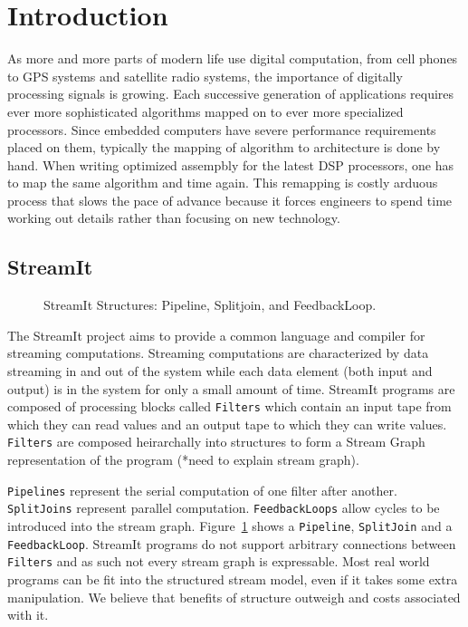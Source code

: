 \section{Introduction}
As more and more parts of modern life use digital computation, from cell phones to GPS systems
and satellite radio systems, the importance of digitally processing signals is growing.
Each successive generation of applications requires ever more sophisticated algorithms mapped 
on to ever more specialized processors. Since embedded computers have severe performance
requirements placed on them, typically the mapping of algorithm to architecture is done by hand.
When writing optimized assempbly for the latest DSP processors, one has to map the same algorithm
and time again. This remapping is costly arduous process that slows the pace of advance
because it forces engineers to spend time working out details rather than focusing on new technology.

\subsection{StreamIt}
\begin{figure}
\center
\epsfxsize=4.5in
\caption{StreamIt Structures: Pipeline, Splitjoin, and FeedbackLoop.}
\label{fig:structures}
\end{figure}

The StreamIt\cite{thies02streamit,thies01streamit,william-stream,michal-common} project
aims to provide a common language and compiler for streaming computations. Streaming computations
are characterized by data streaming in and out of the system while each data element (both
input and output) is in the system for only a small amount of time. 
StreamIt programs are composed of processing blocks called {\tt Filters} which
contain an input tape from which they can read values and an output tape to which
they can write values. {\tt Filters} are composed heirarchally into structures to form
a Stream Graph representation of the program (*need to explain stream graph).
 
{\tt Pipelines} represent the serial computation of one filter after another.
{\tt SplitJoins} represent parallel computation. {\tt FeedbackLoops} allow cycles
to be introduced into the stream graph. Figure~\ref{fig:structures} shows a {\tt Pipeline},
{\tt SplitJoin} and a {\tt FeedbackLoop}. StreamIt programs do not support arbitrary connections
between {\tt Filters} and as such not every stream graph is expressable. Most real world programs
can be fit into the structured stream model, even if it takes some extra manipulation. We believe
that benefits of structure outweigh and costs associated with it.

